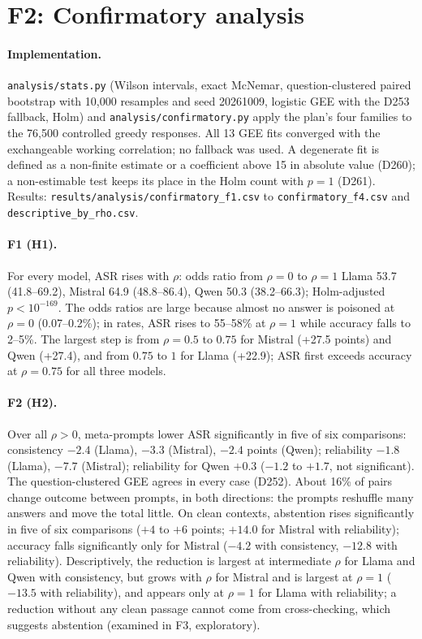 \documentclass[11pt,a4paper]{report}
\begin{document}
\section{F2: Confirmatory analysis}

\paragraph{Implementation.} \texttt{analysis/stats.py} (Wilson intervals, exact McNemar, question-clustered
paired bootstrap with 10{,}000 resamples and seed 20261009, logistic GEE with the D253 fallback, Holm) and
\texttt{analysis/confirmatory.py} apply the plan's four families to the 76{,}500 controlled greedy responses.
All 13 GEE fits converged with the exchangeable working correlation; no fallback was used. A degenerate fit
is defined as a non-finite estimate or a coefficient above 15 in absolute value (D260); a non-estimable test
keeps its place in the Holm count with $p=1$ (D261). Results: \texttt{results/analysis/confirmatory\_f1.csv}
to \texttt{confirmatory\_f4.csv} and \texttt{descriptive\_by\_rho.csv}.

\paragraph{F1 (H1).} For every model, ASR rises with $\rho$: odds ratio from $\rho=0$ to $\rho=1$ Llama 53.7
(41.8--69.2), Mistral 64.9 (48.8--86.4), Qwen 50.3 (38.2--66.3); Holm-adjusted $p<10^{-169}$. The odds
ratios are large because almost no answer is poisoned at $\rho=0$ (0.07--0.2\%); in rates, ASR rises to
55--58\% at $\rho=1$ while accuracy falls to 2--5\%. The largest step is from $\rho=0.5$ to $0.75$ for Mistral
(+27.5 points) and Qwen (+27.4), and from $0.75$ to $1$ for Llama (+22.9); ASR first exceeds accuracy at
$\rho=0.75$ for all three models.

\paragraph{F2 (H2).} Over all $\rho>0$, meta-prompts lower ASR significantly in five of six comparisons:
consistency $-2.4$ (Llama), $-3.3$ (Mistral), $-2.4$ points (Qwen); reliability $-1.8$ (Llama), $-7.7$
(Mistral); reliability for Qwen $+0.3$ ($-1.2$ to $+1.7$, not significant). The question-clustered GEE agrees
in every case (D252). About 16\% of pairs change outcome between prompts, in both directions: the prompts
reshuffle many answers and move the total little. On clean contexts, abstention rises significantly in five
of six comparisons ($+4$ to $+6$ points; $+14.0$ for Mistral with reliability); accuracy falls significantly
only for Mistral ($-4.2$ with consistency, $-12.8$ with reliability). Descriptively, the reduction is largest
at intermediate $\rho$ for Llama and Qwen with consistency, but grows with $\rho$ for Mistral and is
largest at $\rho=1$ ($-13.5$ with reliability), and appears only at $\rho=1$ for Llama with reliability; a
reduction without any clean passage cannot come from cross-checking, which suggests abstention (examined
in F3, exploratory).
\end{document}
